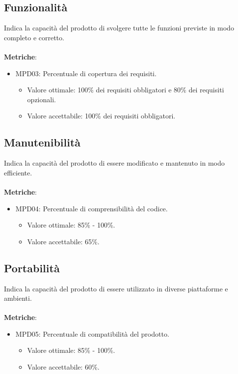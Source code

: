 \documentclass[12pt]{article}
\begin{document}
\subsection{Funzionalità}

	Indica la capacità del prodotto di svolgere tutte le funzioni previste in modo completo e corretto.
	\\\\
	\textbf{Metriche}:
	\begin{itemize}
		\item MPD03: Percentuale di copertura dei requisiti.
		\begin{itemize}	
			\item Valore ottimale: 100\% dei requisiti obbligatori e 80\% dei requisiti opzionali.
			\item Valore accettabile: 100\% dei requisiti obbligatori.
		\end{itemize}
	\end{itemize}

\subsection{Manutenibilità}
	Indica la capacità del prodotto di essere modificato e mantenuto in modo efficiente.
	\\\\
	\textbf{Metriche}:
		\begin{itemize}
			\item MPD04: Percentuale di comprensibilità del codice.
			\begin{itemize}	
				\item Valore ottimale: 85\% - 100\%.
				\item Valore accettabile: 65\%.
			\end{itemize}
		\end{itemize}

\subsection{Portabilità}
	Indica la capacità del prodotto di essere utilizzato in diverse piattaforme e ambienti.
	\\\\
	\textbf{Metriche}:
		  \begin{itemize}
			\item MPD05: Percentuale di compatibilità del prodotto.
			\begin{itemize}	
				\item Valore ottimale: 85\% - 100\%.
				\item Valore accettabile: 60\%.
			\end{itemize}
		\end{itemize}
\end{document}
